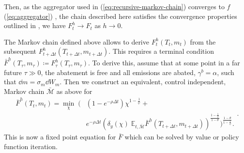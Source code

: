 \documentclass[../../main.tex]{subfiles}
\begin{document}
Then, as the aggregator used in (\ref{eq:recursive-markov-chain}) converges to $f$ (\ref{eq:aggregator}) \citep{epstein_substitution_1989}, the chain described here satisfies the convergence properties outlined in \cite{kushner_numerical_2001}, we have $F^h_t \to F_t$ as $h \to 0$.

The Markov chain defined above allows to derive $F^h_{t}(T_{t}, m_{t})$ from the subsequent $F^h_{t + \Delta t}(T_{t + \Delta t}, m_{t + \Delta t})$. This requires a terminal condition $\bar{F}^h(T_\tau, m_\tau) \coloneqq F^h_{\tau}(T_{\tau}, m_{\tau})$. To derive this, assume that at some point in a far future $\tau \gg 0$, the abatement is free and all emissions are abated, $\gamma^b = \alpha$, such that $\dd{m} = \sigma_m \dd{W}_m$. Then we construct an equivalent, control independent, Markov chain $\bar{\mathcal{M}}$ as above for \begin{equation}
    \begin{split}
        \bar{F}^h(T_t, m_t) = \min_{\chi} \; \Bigg( &\left(1 - e^{-\rho \Delta t}\right) \chi^{1 - \frac{1}{\psi}} + \\
        &e^{-\rho \Delta t} \left(\delta_y(\chi) \; \mathbb{E}_{t, \bar{\mathcal{M}}} \bar{F}^h(T_{t + \Delta t}, m_{t + \Delta t})\right)^{\frac{1 - \frac{1}{\psi}}{1 - \theta}} \Bigg)^{\frac{1 - \theta}{1 - \frac{1}{\psi}}}.
    \end{split}.
\end{equation} This is now a fixed point equation for $\bar{F}$ which can be solved by value or policy function iteration.
\end{document}

